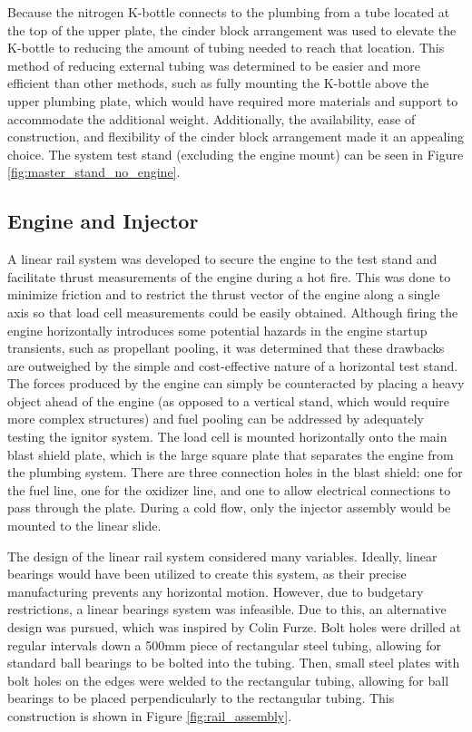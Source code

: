 \documentclass[9pt]{article} %
\numberwithin{equation}{section} %
\begin{document}
Because the nitrogen K-bottle connects to the plumbing from a tube located at the top of the upper plate, the cinder block arrangement was used to elevate the K-bottle to reducing the amount of tubing needed to reach that location. This method of reducing external tubing was determined to be easier and more efficient than other methods, such as fully mounting the K-bottle above the upper plumbing plate, which would have required more materials and support to accommodate the additional weight. Additionally, the availability, ease of construction, and flexibility of the cinder block arrangement made it an appealing choice. The system test stand (excluding the engine mount) can be seen in Figure \ref{fig:master_stand_no_engine}.

\subsection{Engine and Injector}
\hspace{\parindent} A linear rail system was developed to secure the engine to the test stand and facilitate thrust measurements of the engine during a hot fire. This was done to minimize friction and to restrict the thrust vector of the engine along a single axis so that load cell measurements could be easily obtained. Although firing the engine horizontally introduces some potential hazards in the engine startup transients, such as propellant pooling, it was determined that these drawbacks are outweighed by the simple and cost-effective nature of a horizontal test stand. The forces produced by the engine can simply be counteracted by placing a heavy object ahead of the engine (as opposed to a vertical stand, which would require more complex structures) and fuel pooling can be addressed by adequately testing the ignitor system. The load cell is mounted horizontally onto the main blast shield plate, which is the large square plate that separates the engine from the plumbing system. There are three connection holes in the blast shield: one for the fuel line, one for the oxidizer line, and one to allow electrical connections to pass through the plate. During a cold flow, only the injector assembly would be mounted to the linear slide.

The design of the linear rail system considered many variables. Ideally, linear bearings would have been utilized to create this system, as their precise manufacturing prevents any horizontal motion. However, due to budgetary restrictions, a linear bearings system was infeasible. Due to this, an alternative design was pursued, which was inspired by Colin Furze. Bolt holes were drilled at regular intervals down a 500mm piece of rectangular steel tubing, allowing for standard ball bearings to be bolted into the tubing. Then, small steel plates with bolt holes on the edges were welded to the rectangular tubing, allowing for ball bearings to be placed perpendicularly to the rectangular tubing. This construction is shown in Figure \ref{fig:rail_assembly}.
\end{document}
